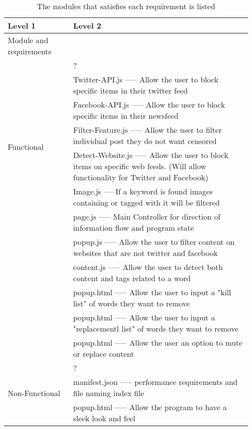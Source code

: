 \documentclass[12pt, titlepage]{article}
\begin{document}
\begin{table}[h!]
\centering
\begin{tabular}{p{} p{}}
\toprule
\textbf{Level 1} & \textbf{Level 2}\\
\midrule
{Module and requirements} & ~ \\
\midrule
\multirow{7}{0.3\textwidth}{Functional} & ?\\
& Twitter-API.js ----- Allow the user to block specific items in their twitter feed\\
& Facebook-API.js ----- Allow the user to block specific items in their newsfeed\\
&Filter-Feature.js ----- Allow the user to filter individual post they do not want censored\\
&Detect-Website.js ----- Allow the user to block items on specific web feeds. (Will allow functionality for Twitter and Facebook)\\
&Image.js -----If a keyword is found images containing or tagged with it will be filtered\\
& page.js ----- Main Controller for direction of information flow and program state\\
& popup.js ----- Allow the user to filter content on websites that are not twitter and facebook\\
& content.js ----- Allow the user to detect both content and tags related to a word\\
& popup.html ----- Allow the user to input a "kill list" of words they want to remove\\
& popup.html ----- Allow the user to input a "replacementl list" of words they want to remove\\
& popup.html ----- Allow the user an option to mute or replace content\\
\midrule
\multirow{3}{0.3\textwidth}{Non-Functional} & {?}\\
& manifest.json ----- performance requirements and file naming index file\\
& popup.html ----- Allow the program to have a sleek look and feel\\

\bottomrule
\end{tabular}
\caption{The modules that satisfies each requirement is listed}
\label{TblMH}
\end{table}
\end{document}
